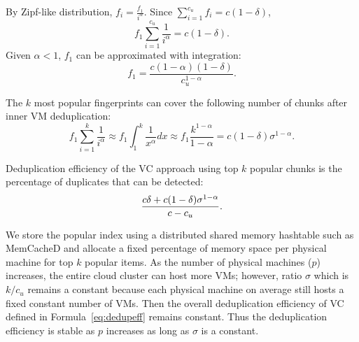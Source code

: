 By Zipf-like distribution, $f_i = \frac{f_1}{i^\alpha}.$
Since $ \sum_{i=1}^{c_u}f_i = c (1-\delta)$,
\[
f_1 \sum_{i=1}^{c_u}\frac{1}{i^\alpha} = c (1-\delta).
\]
Given $\alpha <1$, $f_1$ can be approximated with integration:
\begin{equation}
f_1=\frac{c(1-\alpha)(1-\delta)}{c_u^{1-\alpha}}.
\end{equation}

The  $k$ most popular fingerprints can cover the following number of chunks after inner VM 
deduplication:
\[
f_1 \sum_{i=1}^{k}\frac{1}{i^\alpha} \approx  
f_1 \int_{1}^{k}\frac{1}{x^\alpha} dx  \approx  f_1\frac{  k^{1-\alpha}} {1-\alpha}
=c(1-\delta) \sigma^{1-\alpha}.
\]

Deduplication efficiency of the VC approach using top $k$ popular chunks
is the percentage of duplicates that can be detected:  
\begin{equation}
\label{eq:dedupeff}
\frac{ c\delta + c(1-\delta) \sigma^{1-\alpha}}
{c  - c_u }.\\
\end{equation}

We store the popular index using a distributed shared memory hashtable such as MemCacheD
and allocate a fixed percentage of memory space   per physical machine for top $k$ popular items.
As the number of physical machines ($p$) increases,
the entire cloud cluster can host more VMs; however,  ratio $\sigma$ which is $k/c_u$ remains
a constant because each physical machine on average still hosts a fixed constant number of 
VMs. Then the overall deduplication efficiency of VC defined in Formula~\ref{eq:dedupeff}
remains constant.
Thus the deduplication efficiency is stable  as $p$ increases as long as $\sigma$  is a constant.


